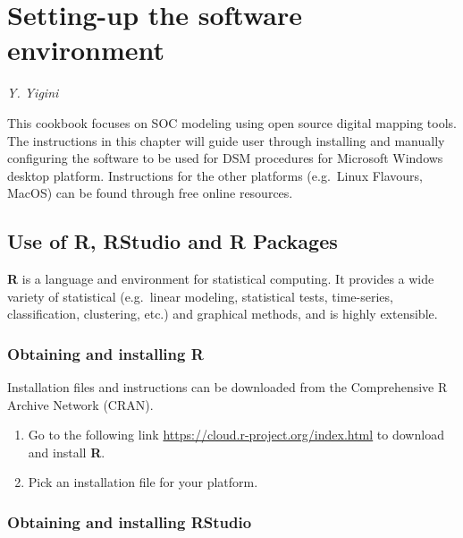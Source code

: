 \documentclass[10pt,b5paper,]{book}
\providecommand{\tightlist}{%
  \setlength{\itemsep}{0pt}\setlength{\parskip}{0pt}}
\theoremstyle{definition}
\theoremstyle{definition}
\theoremstyle{definition}
\theoremstyle{remark}
\begin{document}
\hypertarget{setting-up-the-software-environment}{%
\chapter{Setting-up the software
environment}\label{setting-up-the-software-environment}}

\emph{Y. Yigini}

This cookbook focuses on SOC modeling using open source digital mapping
tools. The instructions in this chapter will guide user through
installing and manually configuring the software to be used for DSM
procedures for Microsoft Windows desktop platform. Instructions for the
other platforms (e.g.~Linux Flavours, MacOS) can be found through free
online resources.

\hypertarget{use-of-r-rstudio-and-r-packages}{%
\section{Use of R, RStudio and R
Packages}\label{use-of-r-rstudio-and-r-packages}}

\textbf{R} is a language and environment for statistical computing. It
provides a wide variety of statistical (e.g.~linear modeling,
statistical tests, time-series, classification, clustering, etc.) and
graphical methods, and is highly extensible.

\hypertarget{obtaining-and-installing-r}{%
\subsection{Obtaining and installing
R}\label{obtaining-and-installing-r}}

Installation files and instructions can be downloaded from the
Comprehensive R Archive Network (CRAN).

\begin{enumerate}
\def\labelenumi{\arabic{enumi}.}
\tightlist
\item
  Go to the following link \url{https://cloud.r-project.org/index.html}
  to download and install \textbf{R}.
\item
  Pick an installation file for your platform.
\end{enumerate}

\hypertarget{obtaining-and-installing-rstudio}{%
\subsection{Obtaining and installing
RStudio}\label{obtaining-and-installing-rstudio}}
\end{document}

